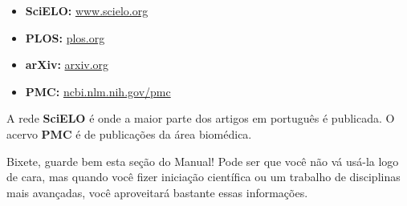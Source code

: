 \begin{itemize}
    \item  \textbf{SciELO:} \url{www.scielo.org}
    \item  \textbf{PLOS:} \url{plos.org}
    \item  \textbf{arXiv:} \url{arxiv.org}
    \item  \textbf{PMC:} \url{ncbi.nlm.nih.gov/pmc}
\end{itemize}

A rede \textbf{SciELO} é onde a maior parte dos artigos em português é
publicada. O acervo \textbf{PMC} é de publicações da área biomédica.

Bixete, guarde bem esta seção do Manual! Pode ser que você não vá usá-la logo
de cara, mas quando você fizer iniciação científica ou um trabalho de
disciplinas mais avançadas, você aproveitará bastante essas informações.
